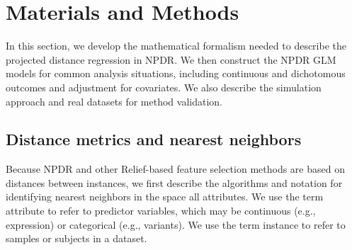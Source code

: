 \documentclass{bioinfo}
\begin{document}
\section{Materials and Methods}
In this section, we develop the mathematical formalism needed to describe the projected distance regression in NPDR.
We then construct the NPDR GLM models for common analysis situations, including continuous and dichotomous outcomes and adjustment for covariates.
We also describe the simulation approach and real datasets for method validation.

\def\ri{R_i}
\def\rj{R_j}
\def\kmi{k_{M_i}}
\def\khi{k_{H_i}}
\def\hji{H_{j_i}}
\def\ma{\overline{M}_a}
\def\ha{\overline{H}_a}
\def\mnu{M_\nu}
\def\hnu{H_\nu}
\def\myd{\text{diff}}
\def\ka{\bar{k}_\alpha}

\subsection{Distance metrics and nearest neighbors}\label{sec:reform}
Because NPDR and other Relief-based feature selection methods are based on distances between instances, we first describe the algorithms and notation for identifying nearest neighbors in the space all attributes.
We use the term attribute to refer to predictor variables, which may be continuous (e.g., expression) or categorical (e.g., variants).
We use the term instance to refer to samples or subjects in a dataset.
\end{document}
